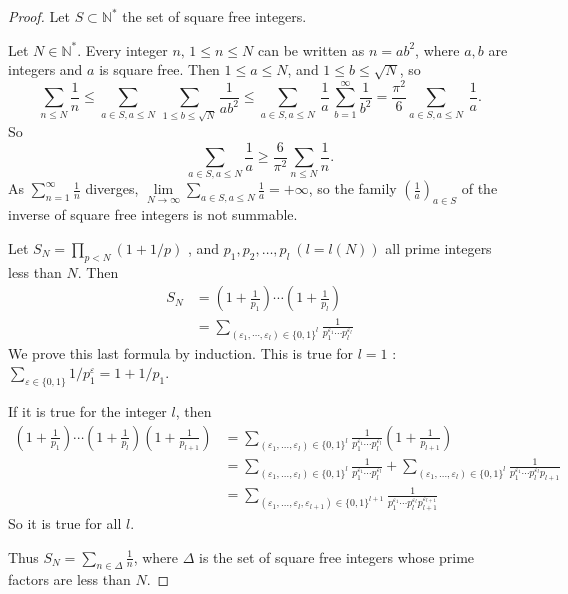 \documentclass[11pt,a4paper]{article}
\newcommand{\N}{\mathbb{N}}
\begin{document}
{\begin{proof}
Let $S \subset \N^*$ the set of square free integers.

Let $N \in \N^*$. Every integer $n, \, 1\leq n \leq N$ can be written as $n = a b^2$, where $a,b$ are integers and $a$ is square free. Then $1\leq a \leq N$, and $1\leq b \leq \sqrt{N}$, so
$$\sum_{n\leq N} \frac{1}{n} \leq \sum_{a \in S, a\leq N}\  \sum_{1\leq b \leq \sqrt{N}} \frac{1}{ab^2} \leq  \sum_{a \in S, a\leq N}\ \frac{1}{a} \, \sum_{b=1}^\infty  \frac{1}{b^2} = \frac{\pi^2}{6} \sum_{a \in S, a\leq N}\ \frac{1}{a}.$$
So $$\sum_{a \in S, a\leq N} \frac{1}{a}  \geq \frac{6}{\pi^2} \sum_{n\leq N} \frac{1}{n}.$$
As $\sum_{n=1}^\infty \frac{1}{n}$ diverges, $\lim\limits_{N \to \infty} \sum\limits_{a \in S, a\leq N} \frac{1}{a} = +\infty$, so the family $\left(\frac{1}{a}\right)_{a\in S}$ of the inverse of square free integers is not summable.

Let $S_N = \prod_{p<N}(1+1/p)$ , and $p_1,p_2,\ldots, p_l\ (l = l(N))$ all prime integers less than $N$. Then
\begin{align*}
S_N &= \left(1+\frac{1}{p_1}\right) \cdots \left(1+\frac{1}{p_l}\right)\\
&=\sum_{(\varepsilon_1,\cdots,\varepsilon_l) \in \{0,1\}^l } \frac{1}{p_1^{\varepsilon_1} \cdots p_l^{\varepsilon_l}}
\end{align*}
We prove this last formula  by induction. This is true for $l=1$ : $\sum_{\varepsilon \in \{0,1\}} 1/p_1^\varepsilon = 1 + 1/p_1$.

If it is true for the integer $l$, then 
\begin{align*}
\left(1+\frac{1}{p_1}\right) \cdots \left(1+\frac{1}{p_l}\right)\left(1+\frac{1}{p_{l+1}}\right) &= \sum_{(\varepsilon_1,\ldots,\varepsilon_l) \in \{0,1\}^l } \frac{1}{p_1^{\varepsilon_1} \cdots p_l^{\varepsilon_l}} \left(1+\frac{1}{p_{l+1}}\right)\\
&=\sum_{(\varepsilon_1,\ldots,\varepsilon_l) \in \{0,1\}^l } \frac{1}{p_1^{\varepsilon_1} \cdots p_l^{\varepsilon_l}} + \sum_{(\varepsilon_1,\ldots,\varepsilon_l) \in \{0,1\}^l } \frac{1}{p_1^{\varepsilon_1} \cdots p_l^{\varepsilon_l}p_{l+1}}\\
&=\sum_{(\varepsilon_1,\ldots,\varepsilon_l,\varepsilon_{l+1}) \in \{0,1\}^{l+1} } \frac{1}{p_1^{\varepsilon_1} \cdots p_l^{\varepsilon_l}p_{l+1}^{\varepsilon_{l+1}}} 
\end{align*}
So it is true for all $l$. 

Thus $S_N = \sum_{n\in \Delta} \frac{1}{n}$, where $\Delta$ is the set of square free integers whose prime factors are less than $N$.


\end{proof}}
\end{document}
